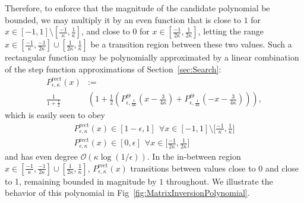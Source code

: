 \documentclass[aps,pra,showpacs,notitlepage,twocolumn,superscriptaddress,nofootinbib]{revtex4-1}
\begin{document}
Therefore, to enforce that the magnitude of the candidate polynomial be bounded, we may multiply it by an even function that is close to $1$ for $x \in [-1, 1] \setminus [\frac{-1}{\kappa}, \frac{1}{\kappa}]$, and close to $0$ for $x \in [\frac{-1}{2\kappa}, \frac{1}{2\kappa}]$, letting the range $x \in [\frac{-1}{\kappa}, \frac{-1}{2\kappa}] \cup [\frac{1}{2\kappa}, \frac{1}{\kappa}]$ be a transition region between these two values. Such a rectangular function may be polynomially approximated by a linear combination of the step function approximations of Section~\ref{sec:Search}:
\begin{equation}
\begin{split}
    P^{\text{rect}}_{\epsilon, \kappa}(x)& := \\
    \frac{1}{1+\frac{\epsilon}{2}}&\left(1 + \frac{1}{2}\left(  P^{\Theta}_{\epsilon, \frac{1}{4 \kappa}} \left( x - \tfrac{3}{4 \kappa} \right) + P^{\Theta}_{\epsilon, \frac{1}{4 \kappa}} \left(-x - \tfrac{3}{4 \kappa} \right) \right) \right),
\end{split}
\end{equation}
which is easily seen to obey
\begin{equation}
\begin{gathered}
        P^{\text{rect}}_{\epsilon, \kappa}(x) \in [1-\epsilon,1] \ \ \forall x \in [-1, 1] \setminus \Big[\frac{-1}{\kappa}, \frac{1}{\kappa} \Big] \\
        P^{\text{rect}}_{\epsilon, \kappa}(x) \in [0,\epsilon] \ \ \forall x \in \Big[\frac{-1}{2\kappa}, \frac{1}{2\kappa} \Big]
\end{gathered}
\end{equation}
and has even degree $\mathcal{O}(\kappa \log(1/\epsilon))$. In the in-between region $x \in [\frac{-1}{\kappa}, \frac{-1}{2\kappa}] \cup [\frac{1}{2\kappa}, \frac{1}{\kappa}]$, $P^{\text{rect}}_{\epsilon, \kappa}(x)$ transitions between values close to 0 and close to 1, remaining bounded in magnitude by $1$ throughout. We illustrate the behavior of this polynomial in Fig~\ref{fig:MatrixInversionPolynomial}.
\end{document}
